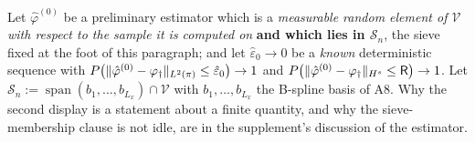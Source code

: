 \begin{definition}\label{def:lfstep}
Let $\hat\varphi^{(0)}$ be a preliminary estimator which is a \emph{measurable random element of
$\mathcal V$ with respect to the sample it is computed on} \textbf{and which lies in $\mathcal S_n$}, the
sieve fixed at the foot of this paragraph; and let $\hat\varepsilon_0\to0$ be a \emph{known}
deterministic sequence with
$P\big(\|\hat\varphi^{(0)}-\varphi_{\dagger}\|_{L^{2}(\pi)}\le\hat\varepsilon_0\big)\to1$ and
$P\big(\|\hat\varphi^{(0)}-\varphi_{\dagger}\|_{H^{s}}\le\mathsf R\big)\to1$. Let
$\mathcal S_n:=\operatorname{span}(b_1,\dots,b_{L_x})\cap\mathcal V$ with $b_1,\dots,b_{L_x}$
the B-spline basis of A8. Why the second display is a statement about a finite quantity, and why the
sieve-membership clause is not idle, are in the supplement's discussion of the estimator.


\end{definition}
